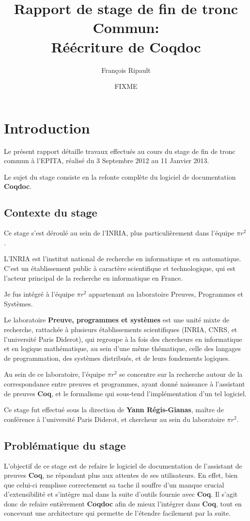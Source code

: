 \documentclass[a4paper, 11pt]{report}
\title{Rapport de stage de fin de tronc Commun: \\
  Réécriture de Coqdoc}
\author{François Ripault}
\date{FIXME}
\newcommand{\pir}[0]{\textbf{$\pi r^2$}\xspace}
\newcommand{\coq}[0]{\textbf{Coq}\xspace}
\newcommand{\coqdoc}[0]{\textbf{Coqdoc}\xspace}
\newcommand{\yrg}[0]{\xspace\textbf{Yann Régis-Gianas}\xspace}
\newcommand{\epita}[0]{EPITA}
\begin{document}
\renewcommand{\labelitemi}{$\bullet$}
\renewcommand{\labelitemii}{$\cdot$}
\renewcommand{\labelitemiii}{$\diamond$}
\renewcommand{\labelitemiv}{$\ast$}

\dominitoc

\thispagestyle{empty}

\tableofcontents
\thispagestyle{empty}

\setcounter{page}{0}
\chapter{Introduction}
  Le présent rapport détaille travaux effectués au cours du stage de fin
  de tronc commun à l'\epita, réalisé du 3 Septembre 2012 au 11 Janvier 2013.

  Le sujet du stage consiste en la refonte complète du logiciel de
  documentation \coqdoc.

  \section{Contexte du stage}
  Ce stage s'est déroulé au sein de l'INRIA, plus particulièrement dans
  l'équipe \pir.

  L'INRIA est l'institut national de recherche en informatique et en
  automatique. C'est un établissement public à caractère scientifique et
  technologique, qui est l'acteur principal de la recherche en informatique en
  France.

  Je fus intégré à l'équipe \pir{} appartenant au laboratoire Preuves, Programmes et
  Systèmes.

  Le laboratoire \textbf{Preuve, programmes et systèmes} est une unité mixte
  de recherche, rattachée à plusieurs établissements scientifiques (INRIA,
  CNRS, et l'université Paris Diderot), qui regroupe à la fois des
  chercheurs en informatique et en logique mathématique, au sein d'une même
  thématique, celle des langages de programmation, des systèmes distribués,
  et de leurs fondements logiques.

  Au sein de ce laboratoire, l'équipe \pir se concentre sur la recherche
  autour de la correspondance entre preuves et programmes, ayant donné
  naissance à l'assistant de preuves \coq, et le formalisme qui sous-tend
  l'implémentation d'un tel logiciel.

  Ce stage fut effectué sous la direction de \yrg, maître de conférence à
  l'université Paris Diderot, et chercheur au sein du laboratoire \pir.

  \section{Problématique du stage}
  L'objectif de ce stage est de refaire le logiciel de documentation de
  l'assistant de preuves \coq, ne répondant plus aux attentes de ses
  utilisateurs.
  En effet, bien que celui-ci remplisse correctement sa tache il souffre d'un
  manque crucial d'extensibilité et s'intègre mal dans la suite d'outils
  fournie avec \coq. Il s'agit donc de refaire entièrement \coqdoc{} afin de
  mieux l'intégrer dans \coq, tout en concevant une architecture qui permette
  de l'étendre facilement par la suite.
\end{document}

